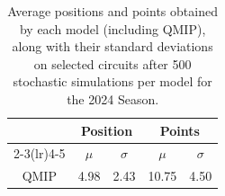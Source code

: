 \begin{table}[H]
\centering
\begin{tabular}{ccccc}
\toprule
\multicolumn{1}{l}{}               & \multicolumn{2}{c}{Position}   & \multicolumn{2}{c}{Points} \\ \cmidrule(lr){2-3}\cmidrule(lr){4-5}
\multicolumn{1}{c}{Model}          &    $\mu$ & $\sigma$ &   $\mu$  & $\sigma$ \\ \midrule
\multicolumn{1}{c}{QMIP          } &     4.98  &     2.43  &    10.75  &     4.50  \\
\bottomrule
\end{tabular}
\caption{Average positions and points obtained by each model (including QMIP), along with their standard deviations on selected circuits after 500 stochastic simulations per model for the 2024 Season.}
\label{tab:tab_qmip_vs_drl_stochastic_2024}
\end{table}